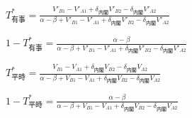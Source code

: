 \documentclass[main.tex]{subfiles}
\begin{document}
\begin{definition} \Large$T^*_{有事} = \frac{ V'_{B1} - V'_{A1} +\delta_{内閣}V'_{B2} - \delta_{内閣}V'_{A2} }{ \alpha-\beta + V'_{B1}-V'_{A1} + \delta_{内閣}V'_{B2} - \delta_{内閣}V'_{A2} }$ \end{definition}

\begin{definition} \Large$1 - T^*_{有事} = \frac{ \alpha-\beta }{ \alpha-\beta + V'_{B1}-V'_{A1} + \delta_{内閣}V'_{B2} - \delta_{内閣}V'_{A2} }$ \end{definition}


\begin{definition} \Large$T^*_{平時} = \frac{ V_{B1} - V_{A1} +\delta_{内閣}V_{B2} - \delta_{内閣}V_{A2} }{ \alpha-\beta + V_{B1}-V_{A1} + \delta_{内閣}V_{B2} - \delta_{内閣}V_{A2} }$ \end{definition}

\begin{definition} \Large$1 - T^*_{平時} = \frac{ \alpha-\beta }{ \alpha-\beta + V_{B1}-V_{A1} + \delta_{内閣}V_{B2} - \delta_{内閣}V_{A2} }$ \end{definition}





\theendnotes
\end{document}
